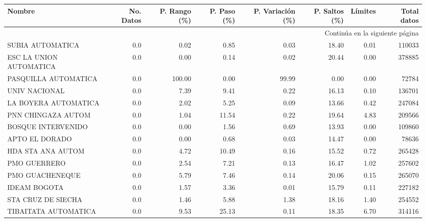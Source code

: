\begin{enumerate}
\begin{landscape}
\begin{longtable}{p{5cm}rrrrrrr}
                  Nombre &  No. Datos &  P. Rango (\%) &  P. Paso (\%)&  P. Variación (\%)&  P. Saltos (\%)&  Límites &Total datos \\
\midrule
\endhead
\midrule
\multicolumn{8}{r}{{Continúa en la siguiente página}} \\
\midrule
\endfoot
\bottomrule
\endlastfoot
        SUBIA AUTOMATICA &        0.0 &      0.02 &           0.85 &     0.03 &      18.40 &          0.01 &       110033 \\
 ESC LA UNION AUTOMATICA &        0.0 &      0.00 &           0.14 &     0.02 &      20.44 &          0.00 &       378885 \\
    PASQUILLA AUTOMATICA &        0.0 &    100.00 &           0.00 &    99.99 &       0.00 &          0.00 &        72784 \\
           UNIV NACIONAL &        0.0 &      7.39 &           9.41 &     0.22 &      16.13 &          0.10 &       136701 \\
    LA BOYERA AUTOMATICA &        0.0 &      2.02 &           5.25 &     0.09 &      13.66 &          0.42 &       247084 \\
      PNN CHINGAZA AUTOM &        0.0 &      1.04 &          11.54 &     0.22 &      19.64 &          4.83 &       209566 \\
      BOSQUE INTERVENIDO &        0.0 &      0.00 &           1.56 &     0.69 &      13.93 &          0.00 &       109860 \\
          APTO EL DORADO &        0.0 &      0.00 &           0.68 &     0.03 &      14.47 &          0.00 &        78636 \\
       HDA STA ANA AUTOM &        0.0 &      4.72 &          10.49 &     0.16 &      15.52 &          0.72 &       265428 \\
            PMO GUERRERO &        0.0 &      2.54 &           7.21 &     0.13 &      16.47 &          1.02 &       257602 \\
         PMO GUACHENEQUE &        0.0 &      5.79 &           7.46 &     0.14 &      20.06 &          0.15 &       265070 \\
            IDEAM BOGOTA &        0.0 &      1.57 &           3.36 &     0.01 &      15.79 &          0.11 &       227182 \\
      STA CRUZ DE SIECHA &        0.0 &      1.46 &           5.88 &     1.38 &      18.16 &          1.40 &       254552 \\
    TIBAITATA AUTOMATICA &        0.0 &      9.53 &          25.13 &     0.11 &      18.35 &          6.70 &       314116 \\

\end{longtable}
\end{landscape}
\end{enumerate}
